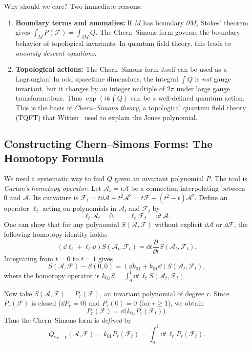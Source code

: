 \documentclass[11pt]{article}
\newcommand{\cA}{\mathcal{A}}
\newcommand{\cF}{\mathcal{F}}
\begin{document}
Why should we care? Two immediate reasons:
\begin{enumerate}
    \item \textbf{Boundary terms and anomalies:} If \(M\) has boundary \(\partial M\), Stokes' theorem gives \(\int_M P(\cF) = \int_{\partial M} Q\). The Chern--Simons form governs the boundary behavior of topological invariants. In quantum field theory, this leads to \emph{anomaly descent equations}.
    \item \textbf{Topological actions:} The Chern--Simons form itself can be used as a Lagrangian! In odd spacetime dimensions, the integral \(\int Q\) is \emph{not} gauge invariant, but it changes by an integer multiple of \(2\pi\) under large gauge transformations. Thus \(\exp(i k \int Q)\) can be a well-defined quantum action. This is the basis of \emph{Chern--Simons theory}, a topological quantum field theory (TQFT) that Witten~\cite{Witten1989} used to explain the Jones polynomial.
\end{enumerate}

\subsection{Constructing Chern--Simons Forms: The Homotopy Formula}
We need a systematic way to find \(Q\) given an invariant polynomial \(P\). The tool is \emph{Cartan's homotopy operator}. Let \(\cA_t = t\cA\) be a connection interpolating between \(0\) and \(\cA\). Its curvature is \(\cF_t = t\dd\cA + t^2\cA^2 = t\cF + (t^2-t)\cA^2\). Define an operator \(\ell_t\) acting on polynomials in \(\cA_t\) and \(\cF_t\) by
\[
\ell_t \cA_t = 0, \qquad \ell_t \cF_t = \dd t \, \cA.
\]
One can show that for any polynomial \(S(\cA,\cF)\) without explicit \(\dd\cA\) or \(\dd\cF\), the following homotopy identity holds:
\[
(\dd \ell_t + \ell_t \dd) S(\cA_t,\cF_t) = \dd t \frac{\partial}{\partial t} S(\cA_t,\cF_t).
\]
Integrating from \(t=0\) to \(t=1\) gives
\[
S(\cA,\cF) - S(0,0) = (\dd k_{01} + k_{01} \dd) S(\cA_t,\cF_t),
\]
where the homotopy operator is \(k_{01} S = \int_0^1 \dd t \, \ell_t S(\cA_t,\cF_t)\).

Now take \(S(\cA,\cF) = P_r(\cF)\), an invariant polynomial of degree \(r\). Since \(P_r(\cF)\) is closed (\(\dd P_r = 0\)) and \(P_r(0) = 0\) (for \(r\ge 1\)), we obtain
\[
P_r(\cF) = \dd \big( k_{01} P_r(\cF_t) \big).
\]
Thus the Chern--Simons form is \emph{defined} by
\[
Q_{2r-1}(\cA,\cF) = k_{01} P_r(\cF_t) = \int_0^1 \dd t \, \ell_t P_r(\cF_t).
\]
\end{document}
